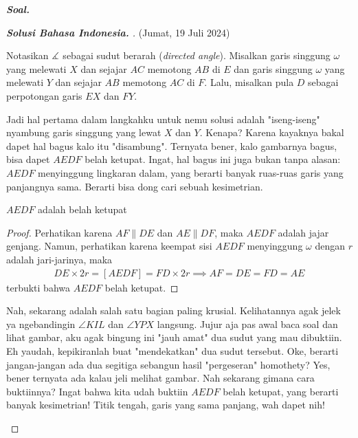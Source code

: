 \textbf{\textit{Soal. }} 
\begin{proof}[\textbf{Solusi Bahasa Indonesia. }] (Jumat, 19 Juli 2024) 
% 

Notasikan $\measuredangle$ sebagai sudut berarah (\textit{directed angle}).
Misalkan garis singgung $\omega$ yang melewati $X$ dan sejajar $AC$ memotong $AB$ di $E$ dan garis singgung $\omega$ yang melewati $Y$ dan sejajar $AB$ memotong $AC$ di $F$. Lalu, misalkan pula $D$ sebagai perpotongan garis $EX$ dan $FY$.

\begin{remark*}
    Jadi hal pertama dalam langkahku untuk nemu solusi adalah "iseng-iseng" nyambung garis singgung yang lewat $X$ dan $Y$. Kenapa? Karena kayaknya bakal dapet hal bagus kalo itu "disambung". Ternyata bener, kalo gambarnya bagus, bisa dapet $AEDF$ belah ketupat. Ingat, hal bagus ini juga bukan tanpa alasan: $AEDF$ menyinggung lingkaran dalam, yang berarti banyak ruas-ruas garis yang panjangnya sama. Berarti bisa dong cari sebuah kesimetrian.
\end{remark*}
\begin{lemmarev}
    $AEDF$ adalah belah ketupat
    \begin{proof}
        Perhatikan karena $AF \parallel DE$ dan $AE \parallel DF$, maka $AEDF$ adalah jajar genjang. Namun, perhatikan karena keempat sisi $AEDF$ menyinggung $\omega$ dengan $r$ adalah jari-jarinya, maka
        \begin{align*}
            DE \times 2r = [AEDF] = FD \times 2r \implies AF =DE = FD = AE 
        \end{align*}
        terbukti bahwa $AEDF$ belah ketupat.
    \end{proof}
\end{lemmarev}

\begin{remark*}
    Nah, sekarang adalah salah satu bagian paling krusial. Kelihatannya agak jelek ya ngebandingin $\angle KIL$ dan $\angle YPX$ langsung. Jujur aja pas awal baca soal dan lihat gambar, aku agak bingung ini "jauh amat" dua sudut yang mau dibuktiin. Eh yaudah, kepikiranlah buat "mendekatkan" dua sudut tersebut. Oke, berarti jangan-jangan ada dua segitiga sebangun hasil "pergeseran" homothety? Yes, bener ternyata ada kalau jeli melihat gambar. Nah sekarang gimana cara buktiinnya? Ingat bahwa kita udah buktiin $AEDF$ belah ketupat, yang berarti banyak kesimetrian! Titik tengah, garis yang sama panjang, wah dapet nih!
\end{remark*}


\end{proof}
